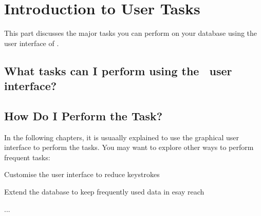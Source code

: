 
\chapter{Introduction to User Tasks}
\label{cha:utasks}

This part discusses the major tasks you can perform on your database
using the user interface of \Pyb.


\section{What tasks can I perform using the \Pyb\ user interface?}
\label{sec:utaskswhat}


\section{How Do I Perform the Task?}
\label{sec:utaskshow}

In the following chapters, it is usuaally explained to use the
graphical user interface to perform the tasks.  
You may want to explore other ways to perform frequent tasks:
\begin{itemize*}
\item Customise the user interface to reduce keystrokes
\item Extend the database to keep frequently used data in esay reach
\item ...
\end{itemize*}






